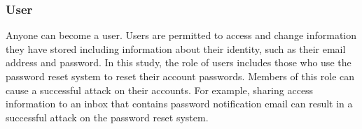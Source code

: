 \subsubsection{User} 
Anyone can become a user.  Users are permitted to access and change
information they have stored including information about their identity,
such as their email address and password. In this study, the role of
users includes those who use the password reset system to reset their
account passwords. Members of this role can cause a successful attack
on their accounts. For example, sharing access information to an inbox
that contains password notification email can result in a successful
attack on the password reset system.

